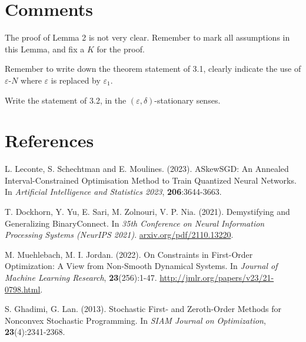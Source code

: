 \documentclass[10pt,a4paper]{article}
\begin{document}
\newpage
\section{Comments}
\begin{enumerate}[label=\text{[}\arabic*\text{]}]
  \item The proof of Lemma 2 is not very clear. Remember to mark all assumptions in this Lemma, and fix a $K$ for the proof.
  \item Remember to write down the theorem statement of 3.1, clearly indicate the use of $\varepsilon$-$N$ where $\varepsilon$ is replaced by $\varepsilon_1$.
  \item Write the statement of 3.2, in the $(\varepsilon, \delta)$-stationary senses.
\end{enumerate}


\newpage
\section{References}
\begin{enumerate}[label=\text{[}\arabic*\text{]}]
  \item \label{1}L. Leconte, S. Schechtman and E. Moulines. (2023). ASkewSGD: An Annealed Interval-Constrained Optimisation Method to Train Quantized Neural Networks. In \textit{Artificial Intelligence and Statistics 2023}, \textbf{206}:3644-3663.
  \item \label{2}T. Dockhorn, Y. Yu, E. Sari, M. Zolnouri, V. P. Nia. (2021). Demystifying and Generalizing BinaryConnect. In \textit{35th Conference on Neural Information Processing Systems (NeurIPS 2021)}. \url{arxiv.org/pdf/2110.13220}.
  \item \label{3}M. Muehlebach, M. I. Jordan. (2022). On Constraints in First-Order Optimization: A View from Non-Smooth Dynamical Systems. In \textit{Journal of Machine Learning Research}, \textbf{23}(256):1-47. \url{http://jmlr.org/papers/v23/21-0798.html}.
  \item \label{4}S. Ghadimi, G. Lan. (2013). Stochastic First- and Zeroth-Order Methods for Nonconvex Stochastic Programming. In \textit{SIAM Journal on Optimization}, \textbf{23}(4):2341-2368.

\end{enumerate}
\end{document}
